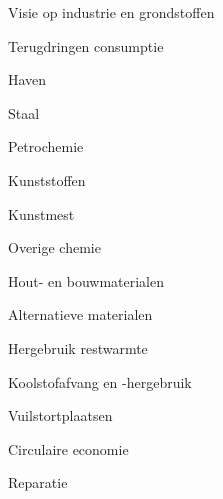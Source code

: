 
\begin{visie-concept}{Visie op industrie en grondstoffen}\end{visie-concept}

\begin{voorstel-concept}{Terugdringen consumptie}\end{voorstel-concept}
\begin{voorstel-concept}{Haven}\end{voorstel-concept}
\begin{voorstel-concept}{Staal}\end{voorstel-concept}
\begin{voorstel-concept}{Petrochemie}\end{voorstel-concept}
\begin{voorstel-concept}{Kunststoffen}\end{voorstel-concept}
\begin{voorstel-concept}{Kunstmest}\end{voorstel-concept}
\begin{voorstel-concept}{Overige chemie}\end{voorstel-concept}
\begin{voorstel-concept}{Hout- en bouwmaterialen}\end{voorstel-concept}
\begin{voorstel-concept}{Alternatieve materialen}\end{voorstel-concept}
\begin{voorstel-concept}{Hergebruik restwarmte}\end{voorstel-concept}
\begin{voorstel-concept}{Koolstofafvang en -hergebruik}\end{voorstel-concept}
\begin{voorstel-concept}{Vuilstortplaatsen}\end{voorstel-concept}
\begin{voorstel-concept}{Circulaire economie}\end{voorstel-concept}
\begin{voorstel-concept}{Reparatie}\end{voorstel-concept}
